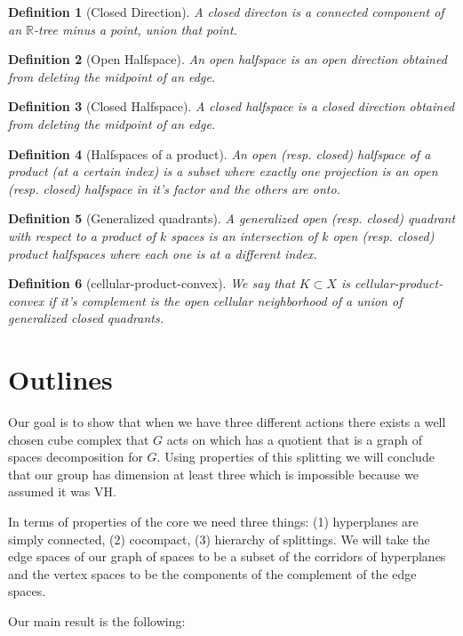 \documentclass{article}
\theoremstyle{mystyle}
\newtheorem{defn}{Definition}
\theoremstyle{remark}
\begin{document}
\begin{defn}[Closed Direction] A closed directon is a connected component of an \(\mathbb{R}\)-tree minus a point, union that point.
\end{defn}
\begin{defn}[Open Halfspace] An open halfspace is an open direction obtained from deleting the midpoint of an edge.
\end{defn}
\begin{defn}[Closed Halfspace] A closed halfspace is a closed direction obtained from deleting the midpoint of an edge.
\end{defn}
\begin{defn}[Halfspaces of a product] An open (resp. closed) halfspace of a product (at a certain index) is a subset where exactly one projection is an open (resp. closed)  halfspace in it's factor and the others are onto.
\end{defn}
\begin{defn}[Generalized quadrants] A generalized open (resp. closed) quadrant with respect to a product of \(k\) spaces is an intersection of \(k\) open (resp. closed) product halfspaces where each one is at a different index.
\end{defn}
\begin{defn}[cellular-product-convex] We say that \(K \subset X\) is cellular-product-convex if it's complement is the open cellular neighborhood of a union of generalized closed quadrants.
\end{defn}



\section{Outlines}
Our goal is to show that when we have three different actions there exists a well chosen cube complex that \(G\) acts on which has a quotient that is a graph of spaces decomposition for \(G\). Using properties of this splitting we will conclude that our group has dimension at least three which is impossible because we assumed it was VH.

    In terms of properties of the core we need three things: (1) hyperplanes are simply connected, (2) cocompact, (3) hierarchy of splittings. We will take the edge spaces of our graph of spaces to be a subset of the corridors of hyperplanes and the vertex spaces to be the components of the complement of the edge spaces.


    Our main result is the following:
\end{document}
